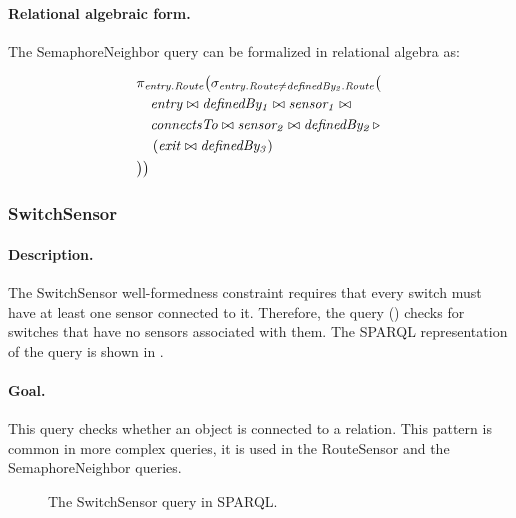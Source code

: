 \paragraph{Relational algebraic form.} The \textsf{SemaphoreNeighbor} query can be formalized in relational algebra as:

\begin{align*}
& \pi_{\mathit{entry.Route}} \big( \sigma_{\mathit{entry.Route} \neq \mathit{definedBy_2.Route}} \big( \\
& \quad \mathit{entry} \bowtie \mathit{definedBy_1} \bowtie \mathit{sensor_1} \bowtie \\
& \quad \mathit{connectsTo} \bowtie \mathit{sensor_2} \bowtie \mathit{definedBy_2} \, \triangleright \, \\
& \quad \left( \mathit{exit} \bowtie \mathit{definedBy_3} \right) \\
& \big) \big)
\end{align*}

\subsubsection{SwitchSensor}

\paragraph{Description.} The \textsf{SwitchSensor} well-formedness constraint requires that every switch must have at least one sensor connected to it. Therefore, the query () checks for switches that have no sensors associated with them. The SPARQL representation of the query is shown in .

\paragraph{Goal.} This query checks whether an object is connected to a relation. This pattern is common in more complex queries, \eg it is used in the \textsf{RouteSensor} and the \textsf{SemaphoreNeighbor} queries.

\begin{figure}[htb]
\centering
\begin{minipage}{0.9\textwidth}
  { \alignListing
    }
  \caption{The \textsf{SwitchSensor} query in SPARQL.}
  \label{lst:switchsensor-sparql}
\end{minipage}
\end{figure}


